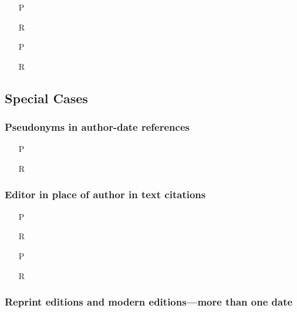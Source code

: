 \documentclass[11pt,letterpaper,oneside]{article}
\begin{document}
\begin{itemize}
\item[P] \parencite[218]{fogel2004b}

\item[R] 

\item[P] \parencite[45--46]{fogel2004a}

\item[R] 
\end{itemize}

\setcounter{subsection}{1}
\subsection{Special Cases}
\setcounter{subsection}{15}

\setcounter{subsubsection}{33}
\subsubsection{Pseudonyms in author-date references}

\begin{itemize}
\item[P] 

\item[R] 
\end{itemize}

\subsubsection{Editor in place of author in text citations}

\begin{itemize}
\item[P] 

\item[R] 

\item[P] 

\item[R] 
\end{itemize}

\setcounter{subsubsection}{37}
\subsubsection{Reprint editions and modern editions---more than one
date}
\end{document}
